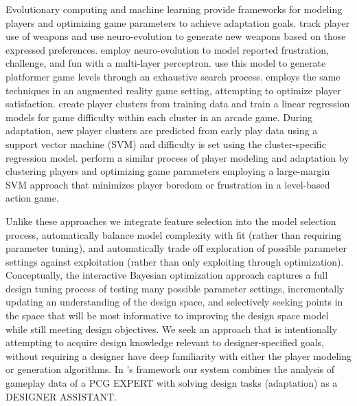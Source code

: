\documentclass[letterpaper]{article}
\begin{document}
Evolutionary computing and machine learning provide frameworks for modeling players and optimizing game parameters to achieve adaptation goals.
\cite{hastings2009:gar} track player use of weapons and use neuro-evolution to generate new weapons based on those expressed preferences.
\cite{pedersen2009:smb} employ neuro-evolution to model reported frustration, challenge, and fun with a multi-layer perceptron. 
\cite{shaker2010:platformer-gen} use this model to generate platformer game levels through an exhaustive search process. 
\cite{yannakakis2009:playermodel} employs the same techniques in an augmented reality game setting, attempting to optimize player satisfaction.
\cite{missura2009:dda} create player clusters from training data and train a linear regression models for game difficulty within each cluster in an arcade game. During adaptation, new player clusters are predicted from early play data using a support vector machine (SVM) and difficulty is set using the cluster-specific regression model.
\cite{yu2011:minboredom} perform a similar process of player modeling and adaptation by clustering players and optimizing game parameters employing a large-margin SVM approach that minimizes player boredom or frustration in a level-based action game.

Unlike these approaches we integrate feature selection into the model selection process, automatically balance model complexity with fit (rather than requiring parameter tuning), and automatically trade off exploration of possible parameter settings against exploitation (rather than only exploiting through optimization). Conceptually, the interactive Bayesian optimization approach captures a full design tuning process of testing many possible parameter settings, incrementally updating an understanding of the design space, and selectively seeking points in the space that will be most informative to improving the design space model while still meeting design objectives. We seek an approach that is intentionally attempting to acquire design knowledge relevant to designer-specified goals, without requiring a designer have deep familiarity with either the player modeling or generation algorithms. In \cite{khaled2013:pcg-metaphor}'s framework our system combines the analysis of gameplay data of a PCG EXPERT with solving design tasks (adaptation) as a DESIGNER ASSISTANT. 


\end{document}
